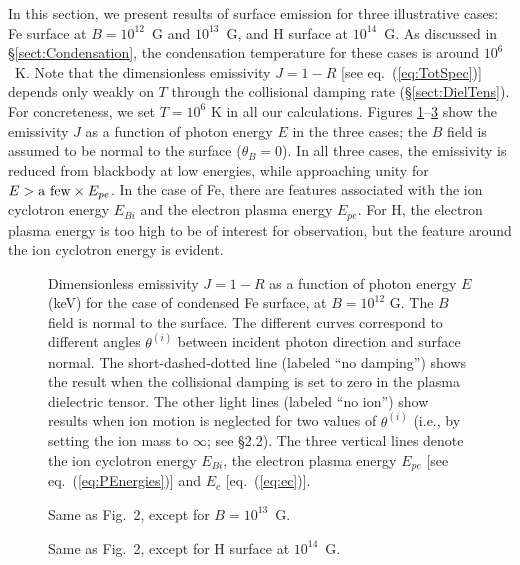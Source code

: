 \documentclass{emulateapj}
\begin{document}
In this section, we present results of surface emission for three illustrative cases:
Fe surface at $B=10^{12}$~G and $10^{13}$~G, and H surface at $10^{14}$~G. As discussed 
in \S\ref{sect:Condensation}, the condensation temperature for these cases is around $10^6$~K.
Note that the dimensionless 
emissivity $J=1-R$ [see eq.~(\ref{eq:TotSpec})] depends only weakly on $T$ through the collisional 
damping rate (\S\ref{sect:DielTens}).  For concreteness, we set $T = 10^6$ K in all 
our calculations.  Figures \ref{fig2}--\ref{fig4}
show the emissivity $J$ as a function of photon energy $E$ in the three cases; the $B$ field 
is assumed to be normal to the surface ($\theta_B = 0$).
In all three cases, the emissivity is reduced from blackbody 
at low energies, while approaching unity for $E>{\rm a~few}\times E_{pe}$.  
In the case of Fe, there are features associated with 
the ion cyclotron energy $E_{Bi}$ and the electron plasma energy
$E_{pe}$.  For H, the electron plasma 
energy is too high to be of interest for observation, but the feature 
around the ion cyclotron energy is evident.

\begin{figure}
\caption{Dimensionless emissivity $J=1-R$ as a function of photon energy 
$E$ (keV) for the case of condensed Fe surface, at 
$B=10^{12}$ G.  The $B$ field is normal to the surface.  
The different curves correspond to different 
angles $\theta^{(i)}$ between incident photon direction and surface 
normal.  The short-dashed-dotted line (labeled ``no damping'')
shows the result when the collisional damping is 
set to zero in the plasma dielectric tensor.   The other light lines 
(labeled ``no ion'') show 
results when ion motion is neglected for two values of $\theta^{(i)}$ (i.e., by 
setting the ion mass to $\infty$; see \S 2.2).
The three vertical lines denote the ion cyclotron energy $E_{Bi}$,
the electron plasma energy $E_{pe}$ [see eq.~(\ref{eq:PEnergies})]
and $E_c$ [eq.~(\ref{eq:ec})].} 
\label{fig2}
\end{figure}

\begin{figure}
\caption{Same as Fig.~2, except for $B=10^{13}$~G.}
\label{fig3}
\end{figure}

\begin{figure}
\caption{Same as Fig.~2, except for H surface at $10^{14}$~G.}
\label{fig4}
\end{figure}
\end{document}
